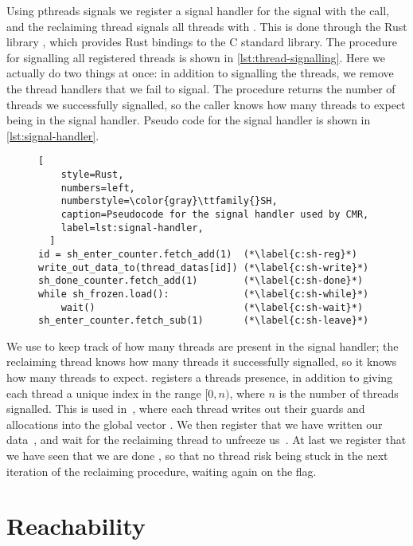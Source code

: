 Using \gls{pthreads} signals we register a signal handler for the  signal with the
 call, and the reclaiming thread signals all threads with .
This is done through the Rust library , which provides Rust bindings to the C standard
library. The procedure for signalling all registered threads is shown in
\cref{lst:thread-signalling}. Here we actually do two things at once: in addition to signalling the
threads, we remove the thread handlers that we fail to signal. The procedure returns the number of
threads we successfully signalled, so the caller knows how many threads to expect being in the
signal handler. Pseudo code for the signal handler is shown in \cref{lst:signal-handler}.

\begin{figure}[ht]
  \begin{lstlisting}[
    style=Rust,
    numbers=left,
    numberstyle=\color{gray}\ttfamily{}SH,
    caption=Pseudocode for the signal handler used by CMR,
    label=lst:signal-handler,
  ]
id = sh_enter_counter.fetch_add(1)  (*\label{c:sh-reg}*)
write_out_data_to(thread_datas[id]) (*\label{c:sh-write}*)
sh_done_counter.fetch_add(1)        (*\label{c:sh-done}*)
while sh_frozen.load():             (*\label{c:sh-while}*)
    wait()                          (*\label{c:sh-wait}*)
sh_enter_counter.fetch_sub(1)       (*\label{c:sh-leave}*)
\end{lstlisting}
\end{figure}


We use  to keep track of how many threads are present in the signal handler;
the reclaiming thread knows how many threads it successfully signalled, so it knows how many threads to
expect.  registers a threads presence, in addition to giving each thread
a unique index in the range $[0, n)$, where $n$ is the number of threads signalled. This is used
in~, where each thread writes out their guards and allocations into
the global vector . We then register that we have written our
data~, and wait for the reclaiming thread to unfreeze
us~. At last we register that we have seen that we are done
, so that no thread risk being stuck in the next iteration of the
reclaiming procedure, waiting again on the  flag.



\section{Reachability}

